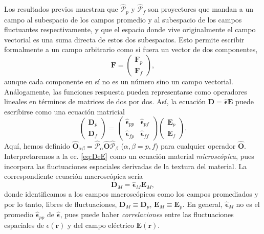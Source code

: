 \documentclass[12pt]{article}
\begin{document}
Los resultados previos muestran que $\hat{\mathcal P}_p$ y
$\hat{\mathcal P}_f$ son proyectores que mandan a un campo al
subespacio de los campos promedio y al subespacio de los campos
fluctuantes respectivamente, y que el espacio donde vive originalmente
el campo vectorial es una suma directa de estos dos subespacios. Esto
permite escribir formalmente a un campo arbitrario como si fuera un
vector de dos componentes,
\begin{equation}
  \label{eq:vectorpf}
  \bm F=
  \begin{pmatrix}
    \bm F_p\\\bm F_f
  \end{pmatrix},
\end{equation}
aunque cada componente en sí no es un número sino un campo
vectorial. Análogamente, las funciones respuesta pueden representarse
como operadores lineales en términos de matrices de dos por dos. Así,
la ecuación $\bm D=\hat{\bm\epsilon} \bm E$ puede escribirse como una
ecuación matricial
\begin{equation}
  \label{eq:DeE}
  \begin{pmatrix}
    \bm D_p\\\bm D_f
  \end{pmatrix}
  =
  \begin{pmatrix}
    \hat{\bm  \epsilon}_{pp}&\hat{\bm  \epsilon}_{pf}\\\hat{\bm
      \epsilon}_{fp}&\hat{\bm  \epsilon}_{ff}
  \end{pmatrix}
  \begin{pmatrix}
    \bm E_p\\\bm E_f
  \end{pmatrix}.
\end{equation}
Aquí, hemos definido $\hat{\bm O}_{\alpha\beta}=\hat{\mathcal
  P}_\alpha\hat {\bm O} \hat{\mathcal P}_\beta$ ($\alpha,\beta=p,f$)
para cualquier operador $\hat{\bm O}$.
Interpretaremos a la ec. \eqref{eq:DeE} como un ecuación material {\em
  microscópica}, pues incorpora las fluctuaciones espaciales derivadas
de la textura del material. La correspondiente ecuación macroscópica
sería
\begin{equation}
  \label{eq:DeEmacro}
  \bm D_M=\hat{\bm \epsilon}_M\bm E_M,
\end{equation}
donde identificamos a los campos macroscópicos como los campos
promediados y por lo tanto, libres de fluctuaciones, $\bm D_M\equiv \bm D_p$,
$\bm E_M\equiv\bm E_p$. En general, $\hat{\bm\epsilon}_M$ no es el
promedio $\hat{\bm\epsilon}_{pp}$ de $\hat{\bm \epsilon}$, pues puede
haber {\em correlaciones} entre las fluctuaciones espaciales de $\epsilon(\bm r)$
y del campo eléctrico $\bm E(\bm r)$.
\end{document}
